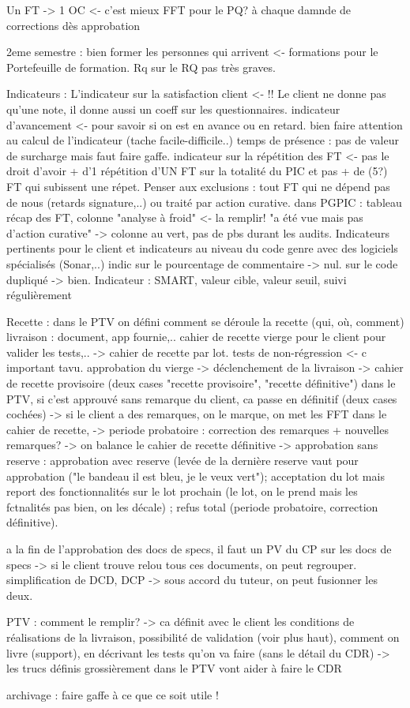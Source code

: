 \documentclass [a4paper] {article}
\begin{document}
Un FT -> 1 OC <- c'est mieux
FFT pour le PQ? à chaque damnde de corrections dès approbation

2eme semestre : bien former les personnes qui arrivent <- formations pour le Portefeuille de formation. 
Rq sur le RQ pas très graves.

Indicateurs :
L'indicateur sur la satisfaction client <- !!
Le client ne donne pas qu'une note, il donne aussi un coeff sur les questionnaires.
indicateur d'avancement <- pour savoir si on est en avance ou en retard. bien faire attention au calcul de l'indicateur (tache facile-difficile..)
temps de présence : pas de valeur de surcharge mais faut faire gaffe.
indicateur sur la répétition des FT <- pas le droit d'avoir + d'1 répétition d'UN FT sur la totalité du PIC et pas + de (5?) FT qui subissent une répet. Penser aux exclusions : tout FT qui ne dépend pas de nous (retards signature,..) ou traité par action curative.
dans PGPIC : tableau récap des FT, colonne "analyse à froid" <- la remplir! "a été vue mais pas d'action curative" -> colonne au vert, pas de pbs durant les audits.
Indicateurs pertinents pour le client et indicateurs au niveau du code genre avec des logiciels spécialisés (Sonar,..) indic sur le pourcentage de commentaire -> nul. sur le code dupliqué -> bien.
Indicateur : SMART, valeur cible, valeur seuil, suivi régulièrement

Recette :
dans le PTV on défini comment se déroule la recette (qui, où, comment) livraison : document, app fournie,.. 
cahier de recette vierge pour le client pour valider les tests,..    -> cahier de recette par lot. tests de non-régression <- c important tavu.
approbation du vierge -> déclenchement de la livraison -> cahier de recette provisoire (deux cases "recette provisoire", "recette définitive") dans le PTV, si c'est approuvé sans remarque du client, ca passe en définitif (deux cases cochées) -> si le client a des remarques, on le marque, on met les FFT dans le cahier de recette, -> periode probatoire : correction des remarques + nouvelles remarques? -> on balance le cahier de recette définitive -> approbation sans reserve : approbation avec reserve (levée de la dernière reserve vaut pour approbation ("le bandeau il est bleu, je le veux vert"); acceptation du lot mais report des fonctionnalités sur le lot prochain (le lot, on le prend mais les fctnalités pas bien, on les décale) ; refus total (periode probatoire, correction définitive).

a la fin de l'approbation des docs de specs, il faut un PV du CP 
sur les docs de specs -> si le client trouve relou tous ces documents, on peut regrouper.
simplification de DCD, DCP -> sous accord du tuteur, on peut fusionner les deux.

PTV : comment le remplir? -> ca définit avec le client les conditions de réalisations de la livraison, possibilité de validation (voir plus haut), comment on livre (support), en décrivant les tests qu'on va faire (sans le détail du CDR) -> les trucs définis grossièrement dans le PTV vont aider à faire le CDR

archivage : faire gaffe à ce que ce soit utile !
\end{document}
